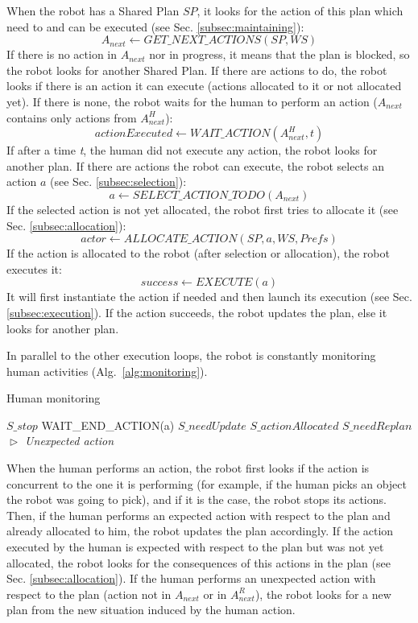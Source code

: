 \documentclass[english,a4paper,11pt,twoside]{StyleThese}
\begin{document}
When the robot has a Shared Plan $SP$, it looks for the action of this plan which need to and can be executed (see Sec. \ref{subsec:maintaining}):
$$A_{next} \leftarrow GET\_NEXT\_ACTIONS(SP, WS)$$
If there is no action in $A_{next}$ nor in progress, it means that the plan is blocked, so the robot looks for another Shared Plan. If there are actions to do, the robot looks if there is an action it can execute (actions allocated to it or not allocated yet). If there is none, the robot waits for the human to perform an action ($A_{next}$ contains only actions from $A^H_{next}$):
$$actionExecuted \leftarrow WAIT\_ACTION(A^H_{next}, t)$$
If after a time \textit{t}, the human did not execute any action, the robot looks for another plan.
If there are actions the robot can execute, the robot selects an action $a$ (see Sec. \ref{subsec:selection}):
$$a \leftarrow SELECT\_ACTION\_TODO(A_{next})$$
If the selected action is not yet allocated, the robot first tries to allocate it (see Sec. \ref{subsec:allocation}):
$$actor \leftarrow ALLOCATE\_ACTION(SP, a, WS, Prefs)$$
If the action is allocated to the robot (after selection or allocation), the robot executes it:
$$success \leftarrow EXECUTE(a)$$
It will first instantiate the action if needed and then launch its execution (see Sec. \ref{subsec:execution}). If the action succeeds, the robot updates the plan, else it looks for another plan.

In parallel to the other execution loops, the robot is constantly monitoring human activities (Alg.~\ref{alg:monitoring}).

\begin{algorithm}
\caption{Human monitoring}
\label{alg:monitoring}
\begin{algorithmic}
\STATE $S\_stop$
\ENDIF
\STATE WAIT\_END\_ACTION(a)
\STATE $S\_needUpdate$
\STATE $S\_actionAllocated$
\ELSE 
\STATE $S\_needReplan$ \hfill \textit{$\vartriangleright$ Unexpected action}
\ENDIF
\ENDIF
\ENDWHILE
\end{algorithmic}
\end{algorithm}

When the human performs an action, the robot first looks if the action is concurrent to the one it is performing (for example, if the human picks an object the robot was going to pick), and if it is the case, the robot stops its actions.  
Then, if the human performs an expected action with respect to the plan and already allocated to him, the robot updates the plan accordingly. If the action executed by the human is expected with respect to the plan but was not yet allocated, the robot looks for the consequences of this actions in the plan (see Sec. \ref{subsec:allocation}).
If the human performs an unexpected action with respect to the plan (action not in $A_{next}$ or in $A^R_{next}$), the robot looks for a new plan from the new situation induced by the human action.
\end{document}
